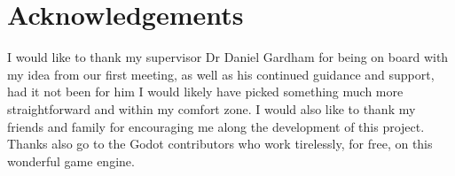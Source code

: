
\chapter*{Acknowledgements}

I would like to thank my supervisor Dr Daniel Gardham for being on board with my idea from our first meeting, as well as his continued guidance and support, 
had it not been for him I would likely have picked something much more straightforward and within my comfort zone.
I would also like to thank my friends and family for encouraging me along the development of this project.
Thanks also go to the Godot contributors who work tirelessly, for free, on this wonderful game engine.